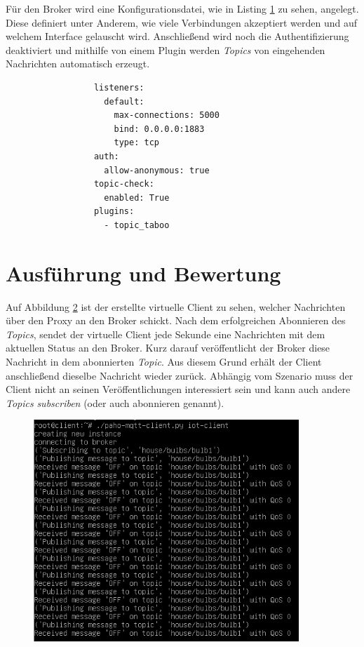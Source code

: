     Für den Broker wird eine Konfigurationsdatei, wie in Listing \ref{fig:broker_config} zu sehen, angelegt. Diese definiert unter Anderem, wie viele Verbindungen akzeptiert werden und auf welchem Interface gelauscht wird. Anschließend wird noch die Authentifizierung deaktiviert und mithilfe von einem Plugin werden \emph{Topics} von eingehenden Nachrichten automatisch erzeugt. 
    \begin{figure}[h]
        \begin{lstlisting}
            listeners:
              default:
                max-connections: 5000
                bind: 0.0.0.0:1883
                type: tcp
            auth:
              allow-anonymous: true
            topic-check:
              enabled: True
            plugins:
              - topic_taboo
        \end{lstlisting}
        \label{fig:broker_config}
    \end{figure}

\section{Ausführung und Bewertung}
Auf Abbildung \ref{fig:client_messages} ist der erstellte virtuelle Client zu sehen, welcher Nachrichten über den Proxy an den Broker schickt.
Nach dem erfolgreichen Abonnieren des \emph{Topics}, sendet der virtuelle Client jede Sekunde eine Nachrichten mit dem aktuellen Status an den Broker. Kurz darauf veröffentlicht der Broker diese Nachricht in dem abonnierten \emph{Topic}. Aus diesem Grund erhält der Client anschließend dieselbe Nachricht wieder zurück. Abhängig vom Szenario muss der Client nicht an seinen Veröffentlichungen interessiert sein und kann auch andere \emph{Topics} \emph{subscriben} (oder auch abonnieren genannt).
\begin{figure}[!h]%
    \centering
    \includegraphics[width=10cm]{tex/bilder/6_validierung/ClientMessages.png}
    \label{fig:client_messages}
\end{figure}

